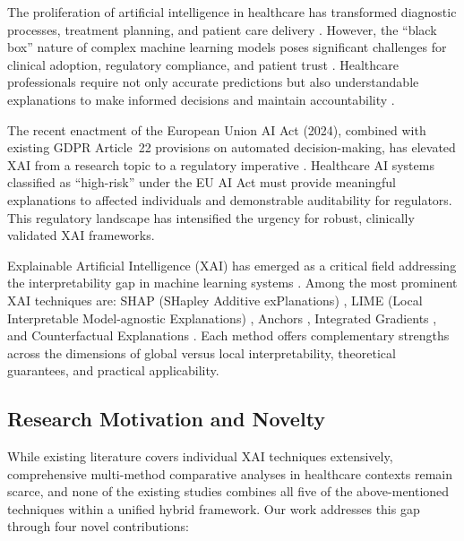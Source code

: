 \documentclass[journal]{IEEEtran}
\newcommand{\citep}[1]{\cite{#1}}
\begin{document}
The proliferation of artificial intelligence in healthcare has transformed diagnostic processes, treatment planning, and patient care delivery \citep{topol2019high}. However, the ``black box'' nature of complex machine learning models poses significant challenges for clinical adoption, regulatory compliance, and patient trust \citep{rudin2019stop}. Healthcare professionals require not only accurate predictions but also understandable explanations to make informed decisions and maintain accountability \citep{holzinger2017we}.

The recent enactment of the European Union AI Act (2024), combined with existing GDPR Article~22 provisions on automated decision-making, has elevated XAI from a research topic to a regulatory imperative \citep{goodman2017european}. Healthcare AI systems classified as ``high-risk'' under the EU AI Act must provide meaningful explanations to affected individuals and demonstrable auditability for regulators. This regulatory landscape has intensified the urgency for robust, clinically validated XAI frameworks.

Explainable Artificial Intelligence (XAI) has emerged as a critical field addressing the interpretability gap in machine learning systems \citep{arrieta2020explainable}. Among the most prominent XAI techniques are: SHAP (SHapley Additive exPlanations) \citep{lundberg2017unified}, LIME (Local Interpretable Model-agnostic Explanations) \citep{ribeiro2016should}, Anchors \citep{ribeiro2018anchors}, Integrated Gradients \citep{sundararajan2017axiomatic}, and Counterfactual Explanations \citep{wachter2017counterfactual}. Each method offers complementary strengths across the dimensions of global versus local interpretability, theoretical guarantees, and practical applicability.

\subsection{Research Motivation and Novelty}

While existing literature covers individual XAI techniques extensively, comprehensive multi-method comparative analyses in healthcare contexts remain scarce, and none of the existing studies combines all five of the above-mentioned techniques within a unified hybrid framework. Our work addresses this gap through four novel contributions:
\end{document}
